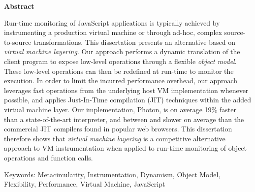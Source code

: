 \begin{center}
\textbf{\large Abstract}
\end{center}

\vspace{1cm}

Run-time monitoring of JavaScript applications is typically achieved by
instrumenting a production virtual machine or through ad-hoc, complex
source-to-source transformations. This dissertation presents an alternative
based on \emph{virtual machine layering}. Our approach performs a dynamic
translation of the client program to expose low-level operations through a
flexible \emph{object model}. These low-level operations can then be redefined
at run-time to monitor the execution. In order to limit the incurred
performance overhead, our approach leverages fast operations from the
underlying host VM implementation whenever possible, and applies Just-In-Time
compilation (JIT) techniques within the added virtual machine layer. Our
implementation, Photon, is on average 19\% faster than a state-of-the-art
interpreter, and between  and  slower on average than the
commercial JIT compilers found in popular web browsers.  This dissertation
therefore shows that \emph{virtual machine layering} is a competitive
alternative approach to VM instrumentation when applied to run-time monitoring
of object operations and function calls.  
			

Keywords: Metacircularity, Instrumentation, Dynamism, Object Model,
Flexibility, Performance, Virtual Machine, JavaScript  
